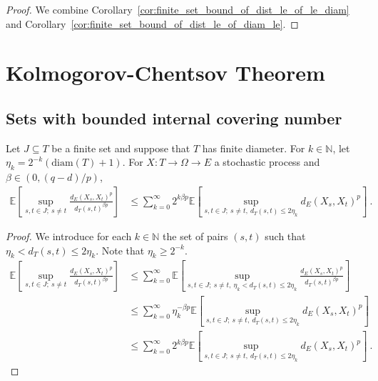 \begin{proof}
We combine Corollary~\ref{cor:finite_set_bound_of_dist_le_of_le_diam} and Corollary~\ref{cor:finite_set_bound_of_dist_le_of_diam_le}.
\end{proof}




\section{Kolmogorov-Chentsov Theorem}


\subsection{Sets with bounded internal covering number}

\begin{lemma}\label{lem:integral_div_dist_le_sum_integral_dist_le}
  \leanok
Let $J \subseteq T$ be a finite set and suppose that $T$ has finite diameter.
For $k \in \mathbb{N}$, let $\eta_k = 2^{-k}(\mathrm{diam}(T) + 1)$.
For $X : T \to \Omega \to E$ a stochastic process and $\beta \in(0, (q - d)/p)$,
\begin{align*}
  \mathbb{E}\left[ \sup_{s, t \in J;\: s \ne t} \frac{d_E(X_s, X_t)^p}{d_T(s, t)^{\beta p}} \right]
  &\le \sum_{k=0}^\infty 2^{k \beta p} \mathbb{E}\left[ \sup_{s, t \in J;\: s \ne t, \: d_T(s, t) \le 2 \eta_k} d_E(X_s, X_t)^p \right]
  \: .
\end{align*}
\end{lemma}

\begin{proof}
We introduce for each $k \in \mathbb{N}$ the set of pairs $(s, t)$ such that $\eta_k < d_T(s, t) \le 2 \eta_k$.
Note that $\eta_k \ge 2^{-k}$.
\begin{align*}
  \mathbb{E}\left[ \sup_{s, t \in J;\: s \ne t} \frac{d_E(X_s, X_t)^p}{d_T(s, t)^{\beta p}} \right]
  &\le \sum_{k=0}^\infty \mathbb{E}\left[ \sup_{s, t \in J;\: s \ne t, \: \eta_k < d_T(s, t) \le 2 \eta_k} \frac{d_E(X_s, X_t)^p}{d_T(s, t)^{\beta p}} \right]
  \\
  &\le \sum_{k=0}^\infty \eta_k^{-\beta p} \mathbb{E}\left[ \sup_{s, t \in J;\: s \ne t, \: d_T(s, t) \le 2 \eta_k} d_E(X_s, X_t)^p \right]
  \\
  &\le \sum_{k=0}^\infty 2^{k \beta p} \mathbb{E}\left[ \sup_{s, t \in J;\: s \ne t, \: d_T(s, t) \le 2 \eta_k} d_E(X_s, X_t)^p \right]
  \: .
\end{align*}
\end{proof}


